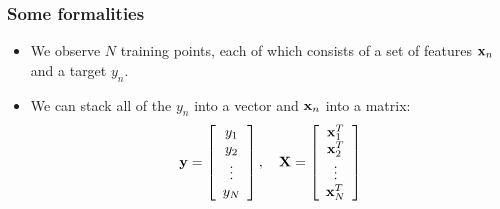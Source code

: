 

\begin{frame}
	\frametitle{Some formalities}
	\begin{itemize}
		\item We observe $N$ training points, each of which consists of a set of features $\mathbf{x}_n$ and a target $y_n$.
		\item We can stack all of the $y_n$ into a vector and $\mathbf{x}_n$ into a matrix:
		\[
		\mathbf{y} = \left[
			\begin{array}{c}
			y_1 \\ y_2 \\ \vdots \\ y_N
			\end{array}
		\right],~~~
		\mathbf{X} = \left[
		\begin{array}{c}
			\mathbf{x}_1^T \\ \mathbf{x}_2^T \\ \vdots \\ \mathbf{x}_N^T
		\end{array}
		\right]
		\]
	\end{itemize}

\end{frame}

